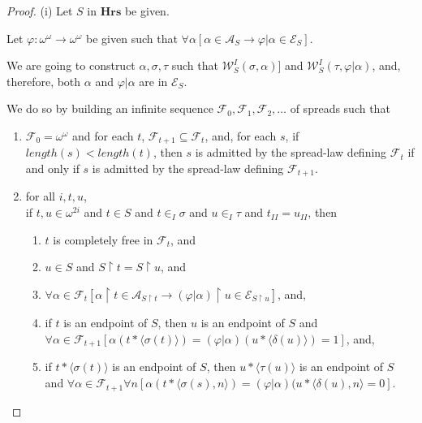\documentclass[a4paper]{amsart}
\theoremstyle{plain}
\begin{document}
 \begin{proof} (i) Let $S$ in $\mathbf{Hrs}$ be given.  
 
 Let $\varphi:\omega^\omega\rightarrow\omega^\omega$ be given such that   $\forall\alpha[\alpha \in \mathcal{A}_S\rightarrow \varphi|\alpha \in \mathcal{E}_S]$.
 
 
 
 
 
 We are going to construct $\alpha, \sigma, \tau$ such that $\mathcal{W}^{I}_S(\sigma, \alpha)]$ and $\mathcal{W}^{I}_S(\tau, \varphi|\alpha)$, and, therefore, both $\alpha$ and $\varphi|\alpha$ are in $\mathcal{E}_S$.  
 
 We do so by building  an infinite sequence $\mathcal{F}_0, \mathcal{F}_1, \mathcal{F}_2, \ldots$ of  spreads such that
 
 \begin{enumerate}[\upshape a.] \item $\mathcal{F}_0 = \omega^\omega$ and for each $t$, $\mathcal{F}_{t+1}\subseteq\mathcal{F}_t$,  and, for each $s$, if $length(s)<length(t)$, then $s$ is admitted by the spread-law defining $\mathcal{F}_t$ if and only if $s$ is admitted by the spread-law defining $\mathcal{F}_{t+1}$.  \item for all $i,t, u$, \\if  $t,u\in \omega^{2i}$ and $t \in S$ and $t\in_I \sigma$ and $u\in_I\tau$ and $t_{II}=u_{II}$,  then \begin{enumerate}[\upshape b1.] \item $t$ is completely free in $\mathcal{F}_t$, and \item $u\in S$ and  $S\upharpoonright t=S\upharpoonright u$,  and \item $\forall \alpha \in \mathcal{F}_t[\alpha\upharpoonright t \in \mathcal{A}_{S\upharpoonright t} \rightarrow (\varphi|\alpha)\upharpoonright u \in \mathcal{E}_{S\upharpoonright u}]$, and, \item if $t$ is an endpoint of $S$,  then $u$ is an endpoint of $S$ and \\$\forall \alpha \in \mathcal{F}_{t+1}[ \alpha(t\ast\langle\sigma(t)\rangle)=(\varphi|\alpha)(u\ast\langle \delta(u)\rangle) =1  ]$,  and, \item if $t\ast\langle \sigma(t)\rangle$ is an endpoint of $S$,   then $u\ast\langle\tau(u)\rangle$ is an endpoint of $S$ and $\forall \alpha \in \mathcal{F}_{t+1}\forall n[ \alpha(t\ast\langle \sigma(s), n\rangle)=(\varphi|\alpha)(u\ast\langle \delta(u), n\rangle = 0]$. \end{enumerate}\end{enumerate}
 

\end{proof}
\end{document}
